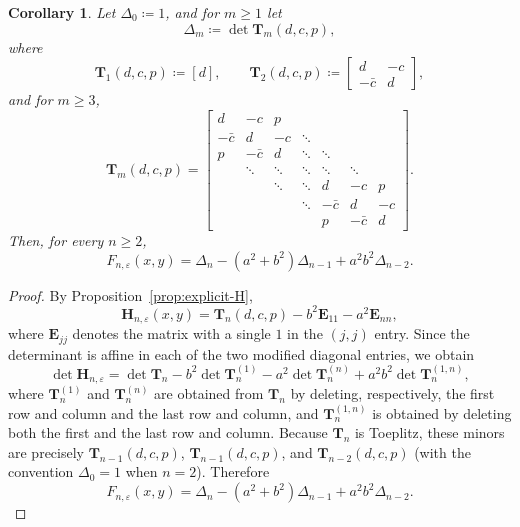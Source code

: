\documentclass[11pt]{article}
\newtheorem{corollary}[theorem]{Corollary}
\begin{document}
\begin{corollary}\label{cor:Toeplitz-reduction}
Let \(\Delta_0\coloneqq 1\), and for \(m\ge 1\) let
\[
\Delta_m\coloneqq \det \mathbf{T}_m(d,c,p),
\]
where
\[
\mathbf{T}_1(d,c,p)\coloneqq [d],
\qquad
\mathbf{T}_2(d,c,p)\coloneqq
\begin{bmatrix}
d & -c \\
-\bar c & d
\end{bmatrix},
\]
and for \(m\ge 3\),
\[
\mathbf{T}_m(d,c,p)
=\begin{bmatrix}
d & -c & p \\
-\bar c & d & -c & \ddots \\
p & -\bar c & d & \ddots & \ddots \\
& \ddots & \ddots & \ddots & \ddots & \ddots \\
&& \ddots & \ddots & d & -c & p \\
&&& \ddots & -\bar c & d & -c \\
&&&& p & -\bar c & d
\end{bmatrix}.
\]
Then, for every \(n\ge 2\),
\[
F_{n,\varepsilon}(x,y)
=\Delta_n-(a^2+b^2)\Delta_{n-1}+a^2b^2\Delta_{n-2}.
\]
\end{corollary}

\begin{proof}
By Proposition~\ref{prop:explicit-H},
\[
\mathbf{H}_{n,\varepsilon}(x,y)=\mathbf{T}_n(d,c,p)-b^2\mathbf{E}_{11}-a^2\mathbf{E}_{nn},
\]
where \(\mathbf{E}_{jj}\) denotes the matrix with a single \(1\) in the \((j,j)\) entry.
Since the determinant is affine in each of the two modified diagonal entries, we obtain
\[
\det \mathbf{H}_{n,\varepsilon}
=\det \mathbf{T}_n
-b^2\det \mathbf{T}_n^{(1)}
-a^2\det \mathbf{T}_n^{(n)}
+a^2b^2\det \mathbf{T}_n^{(1,n)},
\]
where \(\mathbf{T}_n^{(1)}\) and \(\mathbf{T}_n^{(n)}\) are obtained from \(\mathbf{T}_n\) by deleting,
respectively, the first row and column and the last row and column, and
\(\mathbf{T}_n^{(1,n)}\) is obtained by deleting both the first and the last row and column.
Because \(\mathbf{T}_n\) is Toeplitz, these minors are precisely
\(\mathbf{T}_{n-1}(d,c,p)\), \(\mathbf{T}_{n-1}(d,c,p)\), and \(\mathbf{T}_{n-2}(d,c,p)\)
(with the convention \(\Delta_0=1\) when \(n=2\)).
Therefore
\[
F_{n,\varepsilon}(x,y)
=\Delta_n-(a^2+b^2)\Delta_{n-1}+a^2b^2\Delta_{n-2}.
\]
\end{proof}
\end{document}
